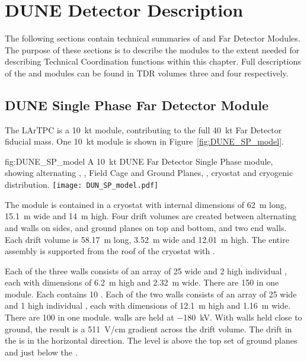 \chapter{DUNE Detector Description}
\label{vl:tc-dune_overview}


The following sections contain technical summaries of 
 and  Far Detector Modules. The purpose of these
sections is to describe the modules to the extent needed for
describing Technical Coordination functions within this chapter. Full
descriptions of the  and  modules can be found
in TDR volumes three and four respectively.

\section{DUNE Single Phase Far Detector Module}
\label{sec:fdsp-SP-module}

The  LArTPC is a \SI{10}{\kilo\tonne} module,
contributing to the full \SI{40}{\kilo\tonne} Far Detector fiducial
mass.  One \SI{10}{\kilo\tonne}  module is shown in
Figure~\ref{fig:DUNE_SP_model}.
\begin{dunefigure}{fig:DUNE_SP_model} {A \SI{10}{\kilo\tonne} DUNE Far Detector
    Single Phase module, showing alternating ,
    , Field Cage and Ground Planes, , cryostat
    and cryogenic distribution.}
  \texttt{[image: DUN\_SP\_model.pdf]}
\end{dunefigure} 

The module is contained in a cryostat with
internal dimensions of \SI{62}{\meter} long, \SI{15.1}{\meter} wide
and \SI{14}{\meter} high.  Four drift volumes are created between
alternating  and  walls on sides,  and
ground planes on top and bottom, and two end walls.  Each drift volume
is \SI{58.17}{\meter} long, \SI{3.52}{\meter} wide and
\SI{12.01}{\meter} high.  The entire assembly is supported from the
roof of the cryostat with .

Each of the three  walls consists of an array of \num{25}
wide and \num{2} high individual , each with dimensions
of \SI{6.2}{\meter} high and \SI{2.32}{\meter} wide. There are
\num{150}  in one module. Each  contains
\num{10} . Each of the two  walls consists of an
array of \num{25} wide and \num{1} high individual , each
with dimensions of \SI{12.1}{\meter} high and \SI{1.16}{\meter}
wide. There are \num{100}  in one module.  
walls are held at $-$\SI{180}{\kilo\volt}. With  walls held
close to ground, the result is a \SI{511}{\volt/\centi\meter} gradient
across the drift volume. The drift in the  is in the horizontal 
direction. The  level is above the top set of ground planes and just
below the .

